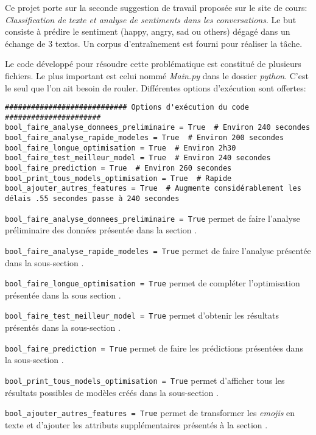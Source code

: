 Ce projet porte sur la seconde suggestion de travail proposée sur le site de cours: \emph{ Classification de texte et analyse de sentiments dans les conversations}. 
Le but consiste à prédire le sentiment (happy, angry, sad ou others) dégagé dans un échange de 3 textos. Un corpus d'entraînement est fourni pour réaliser la tâche. 

Le code développé pour résoudre cette problématique est constitué de plusieurs fichiers. 
Le plus important est celui nommé \emph{Main.py} dans le dossier \emph{python}. C'est le seul que l'on ait besoin de rouler. Différentes options d'exécution sont offertes:

\begin{verbatim}
############################ Options d'exécution du code ######################
bool_faire_analyse_donnees_preliminaire = True  # Environ 240 secondes
bool_faire_analyse_rapide_modeles = True  # Environ 200 secondes
bool_faire_longue_optimisation = True  # Environ 2h30
bool_faire_test_meilleur_model = True  # Environ 240 secondes
bool_faire_prediction = True  # Environ 260 secondes
bool_print_tous_models_optimisation = True  # Rapide
bool_ajouter_autres_features = True  # Augmente considérablement les délais .55 secondes passe à 240 secondes
\end{verbatim}

\verb|bool_faire_analyse_donnees_preliminaire = True| permet de faire l'analyse préliminaire des données présentée dans la section . 

\verb|bool_faire_analyse_rapide_modeles = True| permet de faire l'analyse présentée dans la sous-section . 

\verb|bool_faire_longue_optimisation = True| permet de compléter l'optimisation présentée dans la sous section . 

\verb|bool_faire_test_meilleur_model = True| permet d'obtenir les résultats présentés dans la sous-section . 

\verb|bool_faire_prediction = True| permet de faire les prédictions présentées dans la sous-section . 

\verb|bool_print_tous_models_optimisation = True| permet d'afficher tous les résultats possibles de modèles créés dans la sous-section .

\verb|bool_ajouter_autres_features = True| permet de transformer les \emph{emojis} en texte et d'ajouter les attributs supplémentaires présentés à la section .